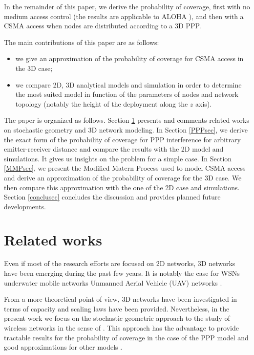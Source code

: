 \documentclass{sig-alternate-05-2015}
\begin{document}
In the remainder of this paper, we derive the probability of coverage, first with no medium access control (the results are applicable to ALOHA \cite{baccelli09}), and then with a CSMA access when nodes are distributed according to a 3D PPP.

The main contributions of this paper are as follows:
\begin{itemize}
 \item we give an approximation of the probability of coverage for CSMA access in the 3D case;
 \item we compare 2D, 3D analytical models and simulation in order to determine the most suited model in function of the parameters of nodes and network topology (notably the height of the deployment along the $z$ axis).
\end{itemize}

The paper is organized as follows. Section \ref{RW} presents and comments related works on stochastic geometry and 3D network modeling. In Section \ref{PPPsec}, we derive the exact form of the probability of coverage for PPP interference for arbitrary emitter-receiver distance and compare the results with the 2D model and simulations. It gives us insights on the problem for a simple case. In Section \ref{MMPsec}, we present the Modified Matern Process used to model CSMA access and derive an approximation of the probability of coverage for the 3D case. We then compare this approximation with the one of the 2D case and simulations. Section \ref{conclusec} concludes the discussion and provides planned future developments.

\section{Related works}
\label{RW}

Even if most of the research efforts are focused on 2D networks, 3D networks have been emerging during the past few years. It is notably the case for WSNs \cite{zhou10,ammari10,doddavenkatappa12} underwater mobile networks \cite{cui06} Unmanned Aerial Vehicle (UAV) networks \cite{valente11}.

From a more theoretical point of view, 3D networks have been investigated in terms of capacity \cite{gupta00,li11} and scaling laws have been provided. Nevertheless, in the present work we focus on the stochastic geometric approach to the study of wireless networks in the sense of \cite{baccelli09,haenggi09}. This approach has the advantage to provide tractable results for the probability of coverage in the case of the PPP model and good approximations for other models \cite{baccelli09}.
\end{document}
